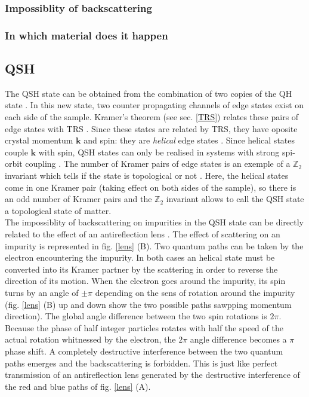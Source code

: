


\subsubsection{Impossiblity of backscattering}

\subsubsection{In which material does it happen}


\subsection{QSH}

The QSH state can be obtained from the combination of two copies of the QH state \cite{buhmann_quantum_2011}. In this new state, two counter propagating channels of edge states exist on each side of the sample. Kramer's theorem (see sec. \ref{TRS}) relates these pairs of edge states with TRS \cite{buhmann_quantum_2011}. Since these states are related by TRS, they have oposite crystal momentum $\mathbf{k}$ and spin: they are \textit{helical} edge states \cite{bernevig_topological_2013}. Since helical states couple $\mathbf{k}$ with spin, QSH states can only be realised in systems with strong spi-orbit coupling \cite{qi_quantum_2010}. The number of Kramer pairs of edge states is an exemple of a $\mathbb{Z}_2$ invariant which tells if the state is topological or not \cite{koenig_quantum_2008}. Here, the helical states come in one Kramer pair (taking effect on both sides of the sample), so there is an odd number of Kramer pairs and the $\mathbb{Z}_2$ invariant allows to call the QSH state a topological state of matter.\\

The impossiblity of backscattering on impurities in the QSH state can be directly related to the effect of an antireflection lens \cite{qi_quantum_2010}. The effect of scattering on an impurity is represented in fig. \ref{lens} (B). Two quantum paths can be taken by the electron encountering the impurity. In both cases an helical state must be converted into its Kramer partner by the scattering in order to reverse the direction of its motion. When the electron goes around the impurity, its spin turns by an angle of $\pm \pi$ depending on the sens of rotation around the impurity (fig. \ref{lens} (B) up and down show the two possible paths sawpping momentum direction). The global angle difference between the two spin rotations is $2\pi$. Because the phase of half integer particles rotates with half the speed of the actual rotation whitnessed by the electron, the $2\pi$ angle difference becomes a $\pi$ phase shift. A completely destructive interference between the two quantum paths emerges and the backscattering is forbidden. This is just like perfect transmission of an antireflection lens generated by the destructive interference of the red and blue paths of fig. \ref{lens} (A). 


